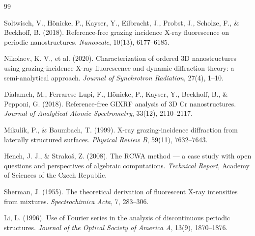 \documentclass[a4paper,11pt]{article}
\begin{document}
\begin{thebibliography}{99}

Soltwisch, V., Hönicke, P., Kayser, Y., Eilbracht, J., Probst, J., Scholze, F., \& Beckhoff, B. (2018). Reference-free grazing incidence X-ray fluorescence on periodic nanostructures. \textit{Nanoscale}, 10(13), 6177--6185.

Nikolaev, K. V., et al. (2020). Characterization of ordered 3D nanostructures using grazing-incidence X-ray fluorescence and dynamic diffraction theory: a semi-analytical approach. \textit{Journal of Synchrotron Radiation}, 27(4), 1--10.

Dialameh, M., Ferrarese Lupi, F., Hönicke, P., Kayser, Y., Beckhoff, B., \& Pepponi, G. (2018). Reference-free GIXRF analysis of 3D Cr nanostructures. \textit{Journal of Analytical Atomic Spectrometry}, 33(12), 2110--2117.

Mikulík, P., \& Baumbach, T. (1999). X-ray grazing-incidence diffraction from laterally structured surfaces. \textit{Physical Review B}, 59(11), 7632--7643.

Hench, J. J., \& Strakoš, Z. (2008). The RCWA method — a case study with open questions and perspectives of algebraic computations. \textit{Technical Report}, Academy of Sciences of the Czech Republic.

Sherman, J. (1955). The theoretical derivation of fluorescent X-ray intensities from mixtures. \textit{Spectrochimica Acta}, 7, 283--306.

Li, L. (1996). Use of Fourier series in the analysis of discontinuous periodic structures. \textit{Journal of the Optical Society of America A}, 13(9), 1870--1876.

\end{thebibliography}
\end{document}
